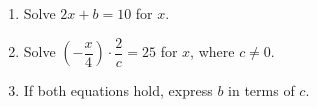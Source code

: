 \begin{enumerate}
\item[(a)] Solve $2x+b=10$ for $x$.
\item[(b)] Solve $\left(-\dfrac{x}{4}\right)\cdot\dfrac{2}{c}=25$ for $x$, where $c\ne0$.
\item[(c)] If both equations hold, express $b$ in terms of $c$.
\end{enumerate}
